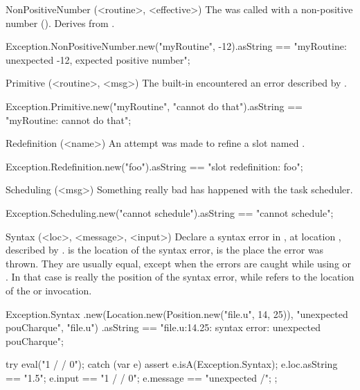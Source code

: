 \begin{urbiscriptapi}
\item[NonPositiveNumber](<routine>, <effective>)
  The  was called with a non-positive number
  ().  Derives from .
\begin{urbiassert}
Exception.NonPositiveNumber.new("myRoutine", -12).asString
== "myRoutine: unexpected -12, expected positive number";
\end{urbiassert}


\item[Primitive](<routine>, <msg>)
  The built-in  encountered an error described by
  .
\begin{urbiassert}
Exception.Primitive.new("myRoutine", "cannot do that").asString
  == "myRoutine: cannot do that";
\end{urbiassert}


\item[Redefinition](<name>)
  An attempt was made to refine a slot named .
\begin{urbiassert}
Exception.Redefinition.new("foo").asString
  == "slot redefinition: foo";
\end{urbiassert}


\item[Scheduling](<msg>)
  Something really bad has happened with the \urbi task scheduler.
\begin{urbiassert}
Exception.Scheduling.new("cannot schedule").asString
  == "cannot schedule";
\end{urbiassert}


\item[Syntax](<loc>, <message>, <input>)%
  Declare a syntax error in , at location , described by
  .   is the location of the syntax error,
   is the place the error was thrown.  They are usually equal,
  except when the errors are caught while using  or
  .  In that case  is really the position of
  the syntax error, while  refers to the location of the
   or  invocation.
\begin{urbiassert}
Exception.Syntax
  .new(Location.new(Position.new("file.u", 14, 25)),
       "unexpected pouCharque", "file.u")
  .asString
== "file.u:14.25: syntax error: unexpected pouCharque";
\end{urbiassert}

\begin{urbiscript}
try
{
  eval("1 / / 0");
}
catch (var e)
{
  assert
  {
    e.isA(Exception.Syntax);
    e.loc.asString == "1.5";
    e.input == "1 / / 0";
    e.message == "unexpected /";
  }
};
\end{urbiscript}



\end{urbiscriptapi}
